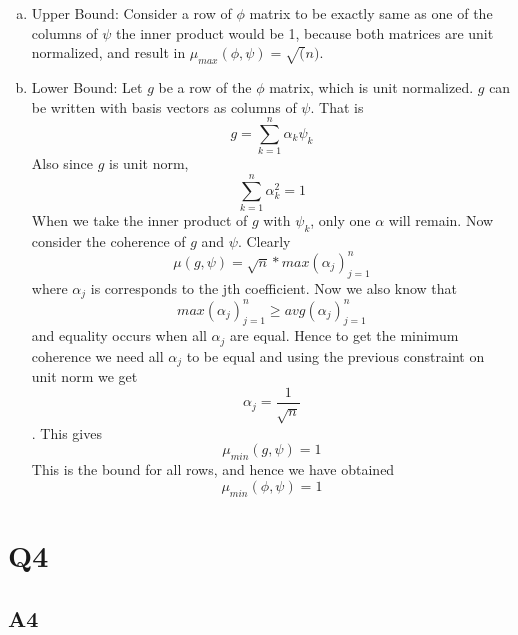 \documentclass{article}
\begin{document}
\begin{enumerate}[(a)]
\item Upper Bound:
  Consider a row of $\phi$ matrix to be exactly same as one of the columns of $\psi$ the inner product would be 1, because both matrices are unit normalized, and result in $\mu_{max}(\phi,\psi) = \sqrt(n)$.
\item Lower Bound:
  Let $g$ be a row of the $\phi$ matrix, which is unit normalized. $g$ can be written with basis vectors as columns of $\psi$. That is
  $$g = \sum_{k=1}^{n}\alpha_k \psi_k$$
  Also since $g$ is unit norm, $$\sum_{k=1}^n\alpha_k^2 = 1$$
  When we take the inner product of $g$ with $\psi_k$, only one $\alpha$ will remain. Now consider the coherence of $g$ and $\psi$. Clearly
  $$\mu(g,\psi) = \sqrt{n} * max(\alpha_j)_{j=1}^n$$ where $\alpha_j$ is corresponds to the jth coefficient. Now we also know that $$max(\alpha_j)_{j=1}^n \ge avg(\alpha_j)_{j=1}^n$$ and equality occurs when all $\alpha_j$ are equal. Hence to get the minimum coherence we need all $\alpha_j$ to be equal and using the previous constraint on unit norm we get $$\alpha_j = \frac{1}{\sqrt{n}}$$. This gives $$\mu_{min}(g,\psi) = 1$$
  This is the bound for all rows, and hence we have obtained $$\mu_{min}(\phi,\psi) = 1$$
\end{enumerate}

\section*{Q4}
\subsection*{A4}
\end{document}

